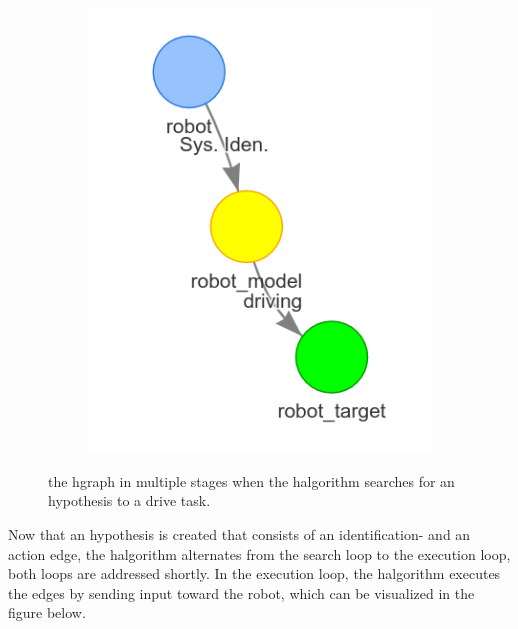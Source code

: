 \begin{figure}[h]
\begin{subfigure}{.3\textwidth}
    \end{subfigure}
    \begin{subfigure}{.3\textwidth}
    \centering
    \includegraphics[width=\textwidth]{figures/proposed_method/connecting_nodes/robot_to_target/robot_iden_drive_target}
    \end{subfigure}
    \caption{the \ac{hgraph} in multiple stages when the \ac{halgorithm} searches for an hypothesis to a drive task.}%
    \label{fig:robot_drive_hgraph}
\end{figure}

Now that an hypothesis is created that consists of an identification- and an action edge, the \ac{halgorithm} alternates from the search loop to the execution loop, both loops are addressed shortly. In the execution loop, the \ac{halgorithm} executes the edges by sending input toward the robot, which can be visualized in the figure below.\bs

